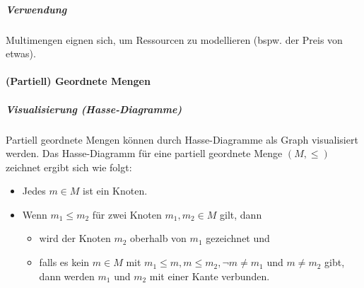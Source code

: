 		    \subparagraph{Verwendung}
		    Multimengen eignen sich, um Ressourcen zu modellieren (bspw. der Preis von etwas).
	    
	    \paragraph{(Partiell) Geordnete Mengen}
		    
		    \subparagraph{Visualisierung (Hasse-Diagramme)}
		    Partiell geordnete Mengen können durch Hasse-Diagramme als Graph visualisiert werden. Das Hasse-Diagramm für eine partiell geordnete Menge $ (M, \leq) $ zeichnet ergibt sich wie folgt:
		    \begin{itemize}
		    	\item Jedes $ m \in M $ ist ein Knoten.
		    	\item Wenn $ m _ 1 \leq m _ 2 $ für zwei Knoten $ m _ 1, m _ 2 \in M $ gilt, dann
			    	\begin{itemize}
			    		\item wird der Knoten $ m _ 2 $ oberhalb von $ m _ 1 $ gezeichnet und
			    		\item falls es kein $ m \in M $ mit $ m _ 1 \leq m, m \leq m _ 2, \lnot m \neq m _ 1 $ und $ m \neq m _ 2 $ gibt, dann werden $ m _ 1 $ und $ m _ 2 $ mit einer Kante verbunden.
			    	\end{itemize}
		    \end{itemize}
	    
